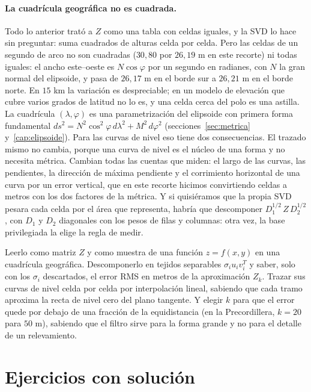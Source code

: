 \paragraph{La cuadrícula geográfica no es cuadrada.} Todo lo anterior trató a \(Z\) como una
tabla con celdas iguales, y la SVD lo hace sin preguntar: suma cuadrados de alturas celda por
celda. Pero las celdas de un segundo de arco no son cuadradas (\(30{,}80\) por \(26{,}19\) m
en este recorte) ni todas iguales: el ancho este--oeste es \(N\cos\varphi\) por un segundo
en radianes, con \(N\) la gran normal del elipsoide, y pasa de \(26{,}17\) m en el borde sur a
\(26{,}21\) m en el borde norte. En \(15\) km la variación es despreciable; en un modelo de elevación que cubre
varios grados de latitud no lo es, y una celda cerca del polo es una astilla. La cuadrícula
\((\lambda,\varphi)\) es una parametrización del elipsoide con primera forma fundamental
\(ds^2=N^2\cos^2\varphi\,d\lambda^2+M^2\,d\varphi^2\) (secciones~\ref{sec:metrica}
y~\ref{cap:elipsoide}). Para las curvas de nivel eso tiene dos consecuencias. El trazado
mismo no cambia, porque una curva de nivel es el núcleo de una forma y no necesita métrica.
Cambian todas las cuentas que miden: el largo de las curvas, las pendientes, la dirección de
máxima pendiente y el corrimiento horizontal de una curva por un error vertical, que en este
recorte hicimos convirtiendo celdas a metros con los dos factores de la métrica. Y si
quisiéramos que la propia SVD pesara cada celda por el área que representa, habría que
descomponer \(D_1^{1/2}\,Z\,D_2^{1/2}\), con \(D_1\) y \(D_2\) diagonales con los pesos de
filas y columnas: otra vez, la base privilegiada la elige la regla de medir.

\begin{resultado}
Leerlo como matriz \(Z\) y como muestra de una función \(z=f(x,y)\) en una cuadrícula geográfica.
Descomponerlo en tejidos separables \(\sigma_iu_iv_i^T\) y saber, solo con los \(\sigma_i\)
descartados, el error RMS en metros de la aproximación \(Z_k\). Trazar sus curvas de nivel
celda por celda por interpolación lineal, sabiendo que cada tramo aproxima la recta de nivel
cero del plano tangente. Y elegir \(k\) para que el error quede por debajo de una fracción de
la equidistancia (en la Precordillera, \(k=20\) para \(50\) m), sabiendo que el filtro sirve
para la forma grande y no para el detalle de un relevamiento.
\end{resultado}

\section{Ejercicios con solución}

